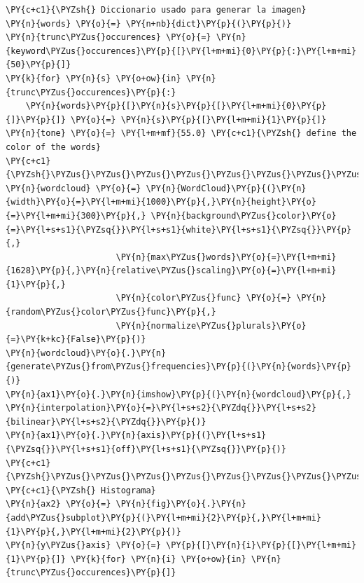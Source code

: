 \begin{tcolorbox}[breakable, size=fbox, boxrule=1pt, pad at break*=1mm,colback=cellbackground, colframe=cellborder]
\begin{Verbatim}[commandchars=\\\{\}]
\PY{c+c1}{\PYZsh{} Diccionario usado para generar la imagen}
\PY{n}{words} \PY{o}{=} \PY{n+nb}{dict}\PY{p}{(}\PY{p}{)}
\PY{n}{trunc\PYZus{}occurences} \PY{o}{=} \PY{n}{keyword\PYZus{}occurences}\PY{p}{[}\PY{l+m+mi}{0}\PY{p}{:}\PY{l+m+mi}{50}\PY{p}{]}
\PY{k}{for} \PY{n}{s} \PY{o+ow}{in} \PY{n}{trunc\PYZus{}occurences}\PY{p}{:}
    \PY{n}{words}\PY{p}{[}\PY{n}{s}\PY{p}{[}\PY{l+m+mi}{0}\PY{p}{]}\PY{p}{]} \PY{o}{=} \PY{n}{s}\PY{p}{[}\PY{l+m+mi}{1}\PY{p}{]}
\PY{n}{tone} \PY{o}{=} \PY{l+m+mf}{55.0} \PY{c+c1}{\PYZsh{} define the color of the words}
\PY{c+c1}{\PYZsh{}\PYZus{}\PYZus{}\PYZus{}\PYZus{}\PYZus{}\PYZus{}\PYZus{}\PYZus{}\PYZus{}\PYZus{}\PYZus{}\PYZus{}\PYZus{}\PYZus{}\PYZus{}\PYZus{}\PYZus{}\PYZus{}\PYZus{}\PYZus{}\PYZus{}\PYZus{}\PYZus{}\PYZus{}\PYZus{}\PYZus{}\PYZus{}\PYZus{}\PYZus{}\PYZus{}\PYZus{}\PYZus{}\PYZus{}\PYZus{}\PYZus{}\PYZus{}\PYZus{}\PYZus{}\PYZus{}\PYZus{}\PYZus{}\PYZus{}\PYZus{}\PYZus{}\PYZus{}\PYZus{}\PYZus{}\PYZus{}\PYZus{}\PYZus{}\PYZus{}\PYZus{}\PYZus{}\PYZus{}\PYZus{}\PYZus{}}
\PY{n}{wordcloud} \PY{o}{=} \PY{n}{WordCloud}\PY{p}{(}\PY{n}{width}\PY{o}{=}\PY{l+m+mi}{1000}\PY{p}{,}\PY{n}{height}\PY{o}{=}\PY{l+m+mi}{300}\PY{p}{,} \PY{n}{background\PYZus{}color}\PY{o}{=}\PY{l+s+s1}{\PYZsq{}}\PY{l+s+s1}{white}\PY{l+s+s1}{\PYZsq{}}\PY{p}{,} 
                      \PY{n}{max\PYZus{}words}\PY{o}{=}\PY{l+m+mi}{1628}\PY{p}{,}\PY{n}{relative\PYZus{}scaling}\PY{o}{=}\PY{l+m+mi}{1}\PY{p}{,}
                      \PY{n}{color\PYZus{}func} \PY{o}{=} \PY{n}{random\PYZus{}color\PYZus{}func}\PY{p}{,}
                      \PY{n}{normalize\PYZus{}plurals}\PY{o}{=}\PY{k+kc}{False}\PY{p}{)}
\PY{n}{wordcloud}\PY{o}{.}\PY{n}{generate\PYZus{}from\PYZus{}frequencies}\PY{p}{(}\PY{n}{words}\PY{p}{)}
\PY{n}{ax1}\PY{o}{.}\PY{n}{imshow}\PY{p}{(}\PY{n}{wordcloud}\PY{p}{,} \PY{n}{interpolation}\PY{o}{=}\PY{l+s+s2}{\PYZdq{}}\PY{l+s+s2}{bilinear}\PY{l+s+s2}{\PYZdq{}}\PY{p}{)}
\PY{n}{ax1}\PY{o}{.}\PY{n}{axis}\PY{p}{(}\PY{l+s+s1}{\PYZsq{}}\PY{l+s+s1}{off}\PY{l+s+s1}{\PYZsq{}}\PY{p}{)}
\PY{c+c1}{\PYZsh{}\PYZus{}\PYZus{}\PYZus{}\PYZus{}\PYZus{}\PYZus{}\PYZus{}\PYZus{}\PYZus{}\PYZus{}\PYZus{}\PYZus{}\PYZus{}\PYZus{}\PYZus{}\PYZus{}\PYZus{}\PYZus{}\PYZus{}\PYZus{}\PYZus{}\PYZus{}\PYZus{}\PYZus{}\PYZus{}\PYZus{}\PYZus{}\PYZus{}\PYZus{}\PYZus{}\PYZus{}\PYZus{}\PYZus{}\PYZus{}\PYZus{}\PYZus{}\PYZus{}\PYZus{}\PYZus{}\PYZus{}\PYZus{}\PYZus{}\PYZus{}\PYZus{}\PYZus{}}
\PY{c+c1}{\PYZsh{} Histograma}
\PY{n}{ax2} \PY{o}{=} \PY{n}{fig}\PY{o}{.}\PY{n}{add\PYZus{}subplot}\PY{p}{(}\PY{l+m+mi}{2}\PY{p}{,}\PY{l+m+mi}{1}\PY{p}{,}\PY{l+m+mi}{2}\PY{p}{)}
\PY{n}{y\PYZus{}axis} \PY{o}{=} \PY{p}{[}\PY{n}{i}\PY{p}{[}\PY{l+m+mi}{1}\PY{p}{]} \PY{k}{for} \PY{n}{i} \PY{o+ow}{in} \PY{n}{trunc\PYZus{}occurences}\PY{p}{]}

\end{Verbatim}
\end{tcolorbox}

